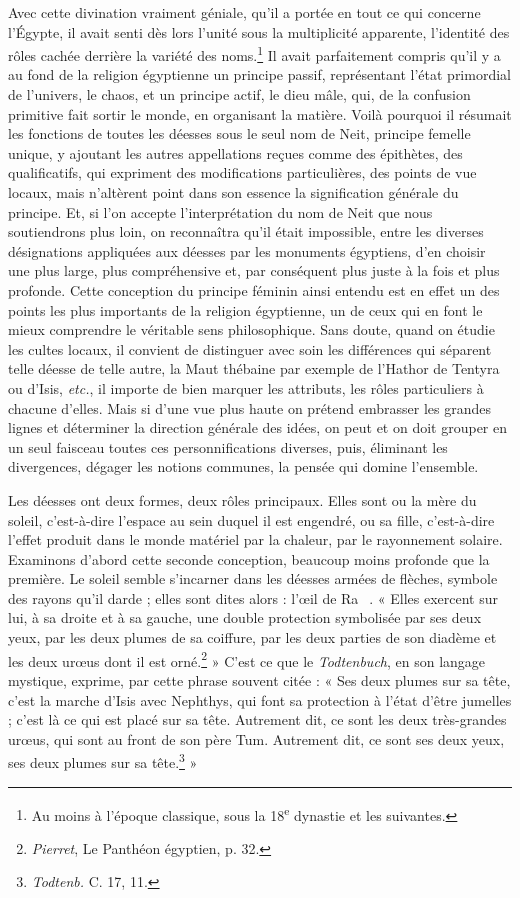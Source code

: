 \documentclass[a4paper, 11pt, oneside]{article}
\newcommand*\hieroAADB{}
\newcommand*\hieroAAOK{}
\newcommand*\hieroAAXA{}
\begin{document}
Avec cette divination vraiment géniale, qu'il a portée en tout ce qui concerne l'Égypte, il avait senti dès lors l'unité sous la multiplicité apparente, l'identité des rôles cachée derrière la variété des noms.\footnote{Au moins à l'époque classique, sous la 18\textsuperscript{e} dynastie et les suivantes.} Il avait parfaitement compris qu'il y a au fond de la religion égyptienne un principe passif, représentant l'état primordial de l'univers, le chaos, et un principe actif, le dieu mâle, qui, de la confusion primitive fait sortir le monde, en organisant la matière. Voilà pourquoi il résumait les fonctions de toutes les déesses sous le seul nom de Neit, principe femelle unique, y ajoutant les autres appellations reçues comme des épithètes, des qualificatifs, qui expriment des modifications particulières, des points de vue locaux, mais n'altèrent point dans son essence la signification générale du principe. Et, si l'on accepte l'interprétation du nom de Neit que nous soutiendrons plus loin, on reconnaîtra qu'il était impossible, entre les diverses désignations appliquées aux déesses par les monuments égyptiens, d'en choisir une plus large, plus compréhensive et, par conséquent plus juste à la fois et plus profonde. Cette conception du principe féminin ainsi entendu est en effet un des points les plus importants de la religion égyptienne, un de ceux qui en font le mieux comprendre le véritable sens philosophique. Sans doute, quand on étudie les cultes locaux, il convient de distinguer avec soin les différences qui séparent telle déesse de telle autre, la Maut thébaine par exemple de l'Hathor de Tentyra ou d'Isis, \emph{etc.}, il importe de bien marquer les attributs, les rôles particuliers à chacune d'elles. Mais si d'une vue plus haute on prétend embrasser les grandes lignes et déterminer la direction générale des idées, on peut et on doit grouper en un seul faisceau toutes ces personnifications diverses, puis, éliminant les divergences, dégager les notions communes, la pensée qui domine l'ensemble.

Les déesses ont deux formes, deux rôles principaux. Elles sont ou la mère du soleil, c'est-à-dire l'espace au sein duquel il est engendré, ou sa fille, c'est-à-dire l'effet produit dans le monde matériel par la chaleur, par le rayonnement solaire. Examinons d'abord cette seconde conception, beaucoup moins profonde que la première. Le soleil semble s'incarner dans les déesses armées de flèches, symbole des rayons qu'il darde ; elles sont dites alors : l'œil de Ra $\hieroAAXA\:\hieroAAOK\:\hieroAADB$. « Elles exercent sur lui, à sa droite et à sa gauche, une double protection symbolisée par ses deux yeux, par les deux plumes de sa coiffure, par les deux parties de son diadème et les deux urœus dont il est orné.\footnote{\emph{Pierret}, Le Panthéon égyptien, p. 32.} » C'est ce que le \emph{Todtenbuch}, en son langage mystique, exprime, par cette phrase souvent citée : « Ses deux plumes sur sa tête, c'est la marche d'Isis avec Nephthys, qui font sa protection à l'état d'être jumelles ; c'est là ce qui est placé sur sa tête. Autrement dit, ce sont les deux très-grandes urœus, qui sont au front de son père Tum. Autrement dit, ce sont ses deux yeux, ses deux plumes sur sa tête.\footnote{\emph{Todtenb.} C. 17, 11.} »
\end{document}
